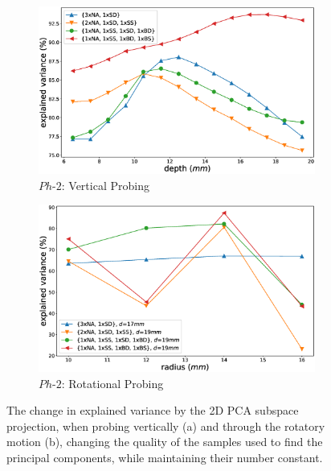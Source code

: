 \begin{figure}[]
\centering
\begin{subfigure}[b]{\columnwidth}
	\includegraphics[width=\columnwidth]{./figs/explained_variance_vertical_quality.eps}
	\caption{$Ph\text{-}2$: Vertical Probing}
	\label{inf_retention_quality:vertical}
\end{subfigure}
\begin{subfigure}[b]{\columnwidth}
	\includegraphics[width=\columnwidth]{./figs/explained_variance_rotation_quality.eps}
	\caption{$Ph\text{-}2$: Rotational Probing}
	\label{inf_retention_quality:Rotation}
\end{subfigure}
\caption{The change in explained variance by the 2D PCA subspace projection, 
	when probing vertically (a) and through the rotatory motion (b), changing the quality of 
	the samples used to find the principal components, while maintaining their number constant. }
\label{inf_retention_quality}
\end{figure}


